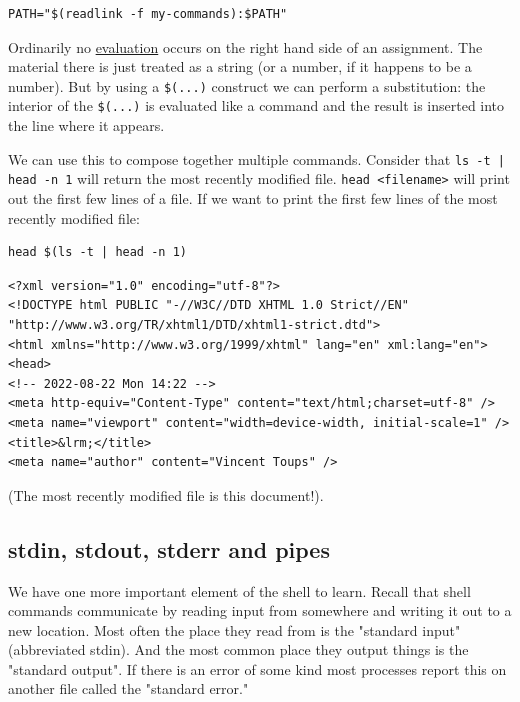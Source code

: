 \documentclass[11pt]{article}
\begin{document}
\begin{verbatim}
PATH="$(readlink -f my-commands):$PATH"
\end{verbatim}

Ordinarily no \uline{evaluation} occurs on the right hand side of an
assignment. The material there is just treated as a string (or a
number, if it happens to be a number). But by using a \texttt{\$(...)}
construct we can perform a substitution: the interior of the \texttt{\$(...)}
is evaluated like a command and the result is inserted into the line
where it appears.

We can use this to compose together multiple commands. Consider that
\texttt{ls -t | head -n 1} will return the most recently modified file. \texttt{head
<filename>} will print out the first few lines of a file. If we want
to print the first few lines of the most recently modified file:

\begin{verbatim}
head $(ls -t | head -n 1)
\end{verbatim}

\begin{verbatim}
<?xml version="1.0" encoding="utf-8"?>
<!DOCTYPE html PUBLIC "-//W3C//DTD XHTML 1.0 Strict//EN"
"http://www.w3.org/TR/xhtml1/DTD/xhtml1-strict.dtd">
<html xmlns="http://www.w3.org/1999/xhtml" lang="en" xml:lang="en">
<head>
<!-- 2022-08-22 Mon 14:22 -->
<meta http-equiv="Content-Type" content="text/html;charset=utf-8" />
<meta name="viewport" content="width=device-width, initial-scale=1" />
<title>&lrm;</title>
<meta name="author" content="Vincent Toups" />
\end{verbatim}

(The most recently modified file is this document!).

\subsection{stdin, stdout, stderr and pipes}
\label{sec:orgebfffad}

We have one more important element of the shell to learn. Recall that
shell commands communicate by reading input from somewhere and writing
it out to a new location. Most often the place they read from is the
"standard input" (abbreviated stdin). And the most common place they
output things is the "standard output". If there is an error of some
kind most processes report this on another file called the "standard
error."
\end{document}
